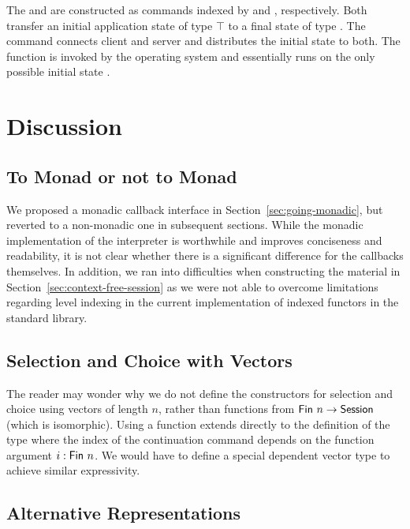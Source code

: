 \documentclass[acmsmall,screen]{acmart}
\begin{document}
The {\Aserver} and {\Aclient} are constructed as commands indexed by
{\Aserverp} and {\Aclientp}, respectively. Both transfer an initial
application state of type $\top$ to a final state of type
{\ABool}. The {\Asystem} command connects client  and server and
distributes the initial state to both. The {\Amain} function is
invoked by the operating system and essentially runs {\Asystem} on the
only possible initial state {\Att}.

\section{Discussion}
\label{sec:discussion}

\subsection{To Monad or not to Monad}
\label{sec:monad-or-not}

We proposed a monadic callback interface in Section~\ref{sec:going-monadic},
but reverted to a non-monadic one in subsequent sections. While the
monadic implementation of the interpreter is worthwhile and improves
conciseness and readability, it is not clear whether there is a
significant difference for the callbacks themselves.
In addition, we ran into difficulties when constructing the material in
Section~\ref{sec:context-free-session} as we were not able to overcome
limitations regarding level indexing in the current implementation
of indexed functors in the standard library.

\subsection{Selection and Choice with Vectors}
\label{sec:select-choice-with}

The reader may wonder why we do not define the constructors for
selection and choice using vectors of length $n$, rather than
functions from $\AFin~n \to \ASession$ (which is isomorphic). Using a function extends
directly to the definition of the {\ACommand} type where the {\ASession} index of the
continuation command depends on the function argument $i : \AFin~n$.
We would have to define a special dependent vector type to achieve similar
expressivity. 

\subsection{Alternative Representations}
\label{sec:code-generation}
\end{document}
